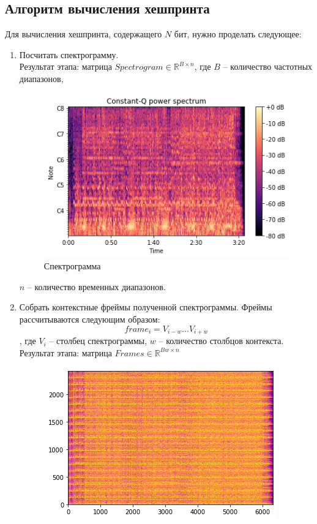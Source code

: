 \subsection{Алгоритм вычисления хешпринта}
Для вычисления хешпринта, содержащего $N$ бит, нужно проделать следующее:
\begin{enumerate}[label=\arabic*.]
    \item Посчитать спектрограмму.\\
    Результат этапа: матрица $Spectrogram \in \mathbb{R}^{B \times n}$, где $B$ -- количество частотных диапазонов,
    \begin{figure}[H]
        \begin{center}
            \includegraphics[scale=0.6]{inc/img/spectrogram.png}
            \caption{Спектрограмма}
        \end{center}
    \end{figure}
    $n$ -- количество временных диапазонов.
    \item Собрать контекстные фреймы полученной спектрограммы.
    Фреймы рассчитываются следующим образом:
    \begin{equation}
    frame_i = V_{i-w}...V_{i+w}
    \end{equation}
    , где $V_i$ -- столбец спектрограммы, $w$ -- количество столбцов контекста.\\
    Результат этапа: матрица $Frames \in \mathbb{R}^{Bw \times n}$
    \begin{figure}[H]
        \begin{center}
            \includegraphics[scale=0.6]{inc/img/frame.png}

\end{center}
\end{figure}
\end{enumerate}

